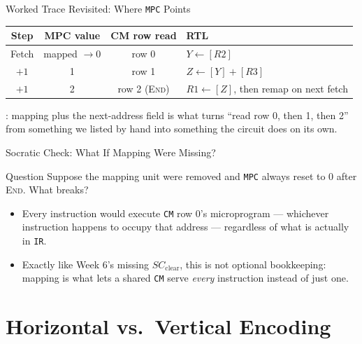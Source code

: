 \documentclass[aspectratio=169]{beamer}
\begin{document}
\begin{frame}{Worked Trace Revisited: Where \texttt{MPC} Points}
  \footnotesize
  \begin{tabular}{@{}cccl@{}}
    \toprule
    \textbf{Step} & \textbf{MPC value} & \textbf{CM row read} & \textbf{RTL} \\
    \midrule
    Fetch & mapped $\to 0$ & row 0 & $Y \gets [R2]$ \\
    $+1$ & 1 & row 1 & $Z \gets [Y] + [R3]$ \\
    $+1$ & 2 & row 2 (\textsc{End}) & $R1 \gets [Z]$, then remap on next fetch \\
    \bottomrule
  \end{tabular}
  \vspace{0.3cm}
  : mapping plus the
  next-address field is what turns ``read row 0, then 1, then 2'' from
  something we listed by hand into something the circuit does on its own.
\end{frame}

\begin{frame}{Socratic Check: What If Mapping Were Missing?}
  \begin{alertblock}{Question}
    Suppose the mapping unit were removed and \texttt{MPC} always reset to 0
    after \textsc{End}. What breaks?
  \end{alertblock}
  \begin{itemize}
    \item Every instruction would execute \texttt{CM} row 0's microprogram
      --- whichever instruction happens to occupy that address --- regardless
      of what is actually in \texttt{IR}.
    \item Exactly like Week 6's missing $SC_{\text{clear}}$, this is not
      optional bookkeeping: mapping is what lets a shared \texttt{CM} serve
      \emph{every} instruction instead of just one.
  \end{itemize}
\end{frame}


\section{Horizontal vs.\ Vertical Encoding}
\end{document}
